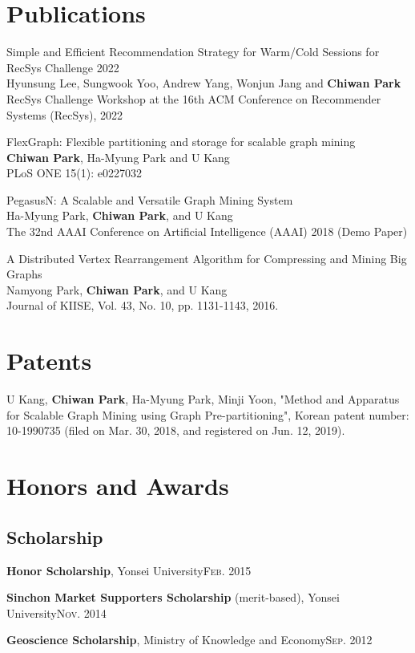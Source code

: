 \documentclass[11pt,a4paper]{article}
\renewenvironment{itemize}{
  \begin{list}{}{
    \setlength{\leftmargin}{1.5em}
    \setlength{\itemsep}{0.5em}
    \setlength{\parskip}{0pt}
    \setlength{\parsep}{0.25em}
  }
}{
  \end{list}
}
\begin{document}
\section*{Publications}
\begin{itemize}
  \item Simple and Efficient Recommendation Strategy for Warm/Cold Sessions for RecSys Challenge 2022\\
  Hyunsung Lee, Sungwook Yoo, Andrew Yang, Wonjun Jang and \textbf{Chiwan Park}\\
  RecSys Challenge Workshop at the 16th ACM Conference on Recommender Systems (RecSys), 2022
  \item FlexGraph: Flexible partitioning and storage for scalable graph mining\\
  \textbf{Chiwan Park}, Ha-Myung Park and U Kang\\
  PLoS ONE 15(1): e0227032
  \item PegasusN: A Scalable and Versatile Graph Mining System\\
  Ha-Myung Park, \textbf{Chiwan Park}, and U Kang\\
  The 32nd AAAI Conference on Artificial Intelligence (AAAI) 2018 (Demo Paper)
  \item A Distributed Vertex Rearrangement Algorithm for Compressing and Mining Big Graphs\\
  Namyong Park, \textbf{Chiwan Park}, and U Kang\\
  Journal of KIISE, Vol. 43, No. 10, pp. 1131-1143, 2016.
\end{itemize}

\section*{Patents}
\begin{itemize}
  \item U Kang, \textbf{Chiwan Park}, Ha-Myung Park, Minji Yoon, "Method and Apparatus for Scalable Graph Mining using Graph Pre-partitioning", Korean patent number: 10-1990735 (filed on Mar. 30, 2018, and registered on Jun. 12, 2019).
\end{itemize}

\section*{Honors and Awards}
\subsection*{Scholarship}
\begin{itemize}
  \setlength\itemsep{0.1em}
  \item \textbf{Honor Scholarship}, Yonsei University\hfill\textsc{Feb. 2015}
  \item \textbf{Sinchon Market Supporters Scholarship} (merit-based), Yonsei University\hfill\textsc{Nov. 2014}
  \item \textbf{Geoscience Scholarship}, Ministry of Knowledge and Economy\hfill\textsc{Sep. 2012}
\end{itemize}
\end{document}
